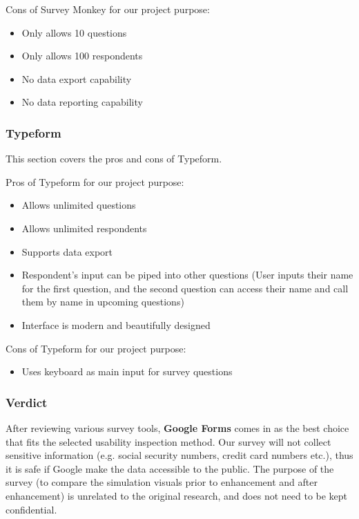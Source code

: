 \documentclass[10pt,journal,compsoc,draftclsnofoot]{IEEEtran}
\begin{document}
Cons of Survey Monkey for our project purpose:
\begin{itemize}
\item Only allows 10 questions
\item Only allows 100 respondents
\item No data export capability
\item No data reporting capability
\end{itemize}

\subsubsection{Typeform}
This section covers the pros and cons of Typeform.

Pros of Typeform for our project purpose:
\begin{itemize}
\item Allows unlimited questions
\item Allows unlimited respondents
\item Supports data export
\item Respondent's input can be piped into other questions (User inputs their name for the first question, and the second question can access their name and call them by name in upcoming questions)
\item Interface is modern and beautifully designed
\end{itemize}

Cons of Typeform for our project purpose:
\begin{itemize}
\item Uses keyboard as main input for survey questions
\end{itemize}

\subsubsection{Verdict}
After reviewing various survey tools, \textbf{Google Forms} comes in as the best choice that fits the selected usability inspection method.
Our survey will not collect sensitive information (e.g. social security numbers, credit card numbers etc.), thus it is safe if Google make the data accessible to the public.
The purpose of the survey (to compare the simulation visuals prior to enhancement and after enhancement) is unrelated to the original research, and does not need to be kept confidential.

\newpage
\end{document}
